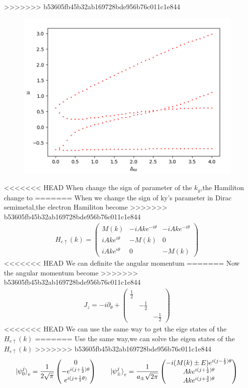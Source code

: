 \documentclass[4pt]{article}
\begin{document}
>>>>>>> b53605fb45b32ab169728bde956b76c011c1e844
\begin{figure}[H]
	\centering
	\includegraphics[scale=0.6]{figure/5}
\end{figure}
<<<<<<< HEAD
When change the sign of parameter of the $k_y$,the Hamiliton change to
=======
When we change the sign of ky's parameter in Dirac semimetal,the electron Hamiliton become
>>>>>>> b53605fb45b32ab169728bde956b76c011c1e844
\begin{align}
	H_{e\uparrow}(k)=
	\begin{pmatrix}
		M(k) & -iAke^{-i\theta}&-iAke^{-i\theta}\\
		iAke^{i\theta}&-M(k)&0\\
		iAke^{i\theta}&0&-M(k)
	\end{pmatrix}
\end{align}
<<<<<<< HEAD
We can definite the angular momentum
=======
Now the angular momentum become
>>>>>>> b53605fb45b32ab169728bde956b76c011c1e844
\begin{align}
	J_z=-i\partial_{\theta}+\begin{pmatrix}
		\frac{1}{2}&&\\
		&-\frac{1}{2}&\\
		&&-\frac{1}{2}
	\end{pmatrix}
\end{align}
<<<<<<< HEAD
We can use the same way to get the eige states of the $H_{e\uparrow}(k)$
=======
Use the same way,we can solve the eigen states of the $H_{e\uparrow}(k)$
>>>>>>> b53605fb45b32ab169728bde956b76c011c1e844
\begin{align}
	\ket{\psi_0^j}_e=\frac{1}{2\sqrt{\pi}}
	\begin{pmatrix}
		0\\
		-e^{i(j+\frac{1}{2})\theta}\\
		e^{i(j+\frac{1}{2}\theta)}
	\end{pmatrix}
	\qquad
	\ket{\psi_{\pm}^j}_e=\frac{1}{a_{\pm}\sqrt{2\pi}}
	\begin{pmatrix}
		-i(M(k)\pm E)e^{i(j-\frac{1}{2})\theta}\\
		Ake^{i(j+\frac{1}{2})\theta}\\
		Ake^{i(j+\frac{3}{2})\theta}
	\end{pmatrix}
\end{align}
\end{document}
